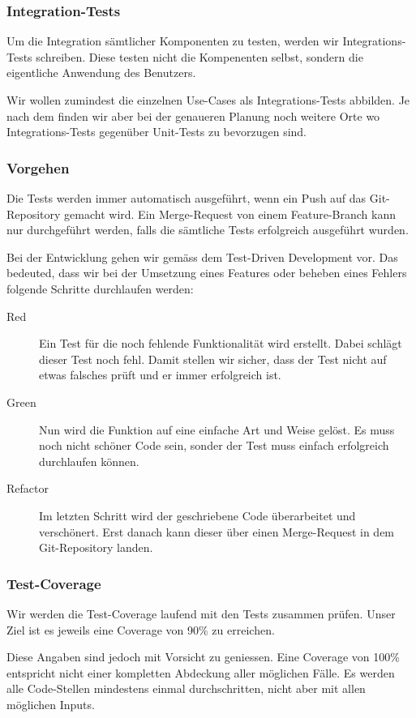 \documentclass[a4paper]{article}
\begin{document}
\subsubsection{Integration-Tests}

Um die Integration sämtlicher Komponenten zu testen, werden wir Integrations-Tests schreiben.
Diese testen nicht die Kompenenten selbst, sondern die eigentliche Anwendung des Benutzers.

Wir wollen zumindest die einzelnen Use-Cases als Integrations-Tests abbilden.
Je nach dem finden wir aber bei der genaueren Planung noch weitere Orte wo Integrations-Tests gegenüber Unit-Tests zu bevorzugen sind.

\subsubsection{Vorgehen}

Die Tests werden immer automatisch ausgeführt, wenn ein Push auf das Git-Repository gemacht wird.
Ein Merge-Request von einem Feature-Branch kann nur durchgeführt werden, falls die sämtliche Tests erfolgreich ausgeführt wurden.

Bei der Entwicklung gehen wir gemäss dem Test-Driven Development vor.
Das bedeuted, dass wir bei der Umsetzung eines Features oder beheben eines Fehlers folgende Schritte durchlaufen werden:

\begin{description}
  \item[Red]
    Ein Test für die noch fehlende Funktionalität wird erstellt.
    Dabei schlägt dieser Test noch fehl.
    Damit stellen wir sicher, dass der Test nicht auf etwas falsches prüft und er immer erfolgreich ist.
  \item[Green]
    Nun wird die Funktion auf eine einfache Art und Weise gelöst.
    Es muss noch nicht schöner Code sein, sonder der Test muss einfach erfolgreich durchlaufen können.
  \item[Refactor]
    Im letzten Schritt wird der geschriebene Code überarbeitet und verschönert.
    Erst danach kann dieser über einen Merge-Request in dem Git-Repository landen.
\end{description}

\subsubsection{Test-Coverage}

Wir werden die Test-Coverage laufend mit den Tests zusammen prüfen.
Unser Ziel ist es jeweils eine Coverage von 90\% zu erreichen.

Diese Angaben sind jedoch mit Vorsicht zu geniessen.
Eine Coverage von 100\% entspricht nicht einer kompletten Abdeckung aller möglichen Fälle.
Es werden alle Code-Stellen mindestens einmal durchschritten, nicht aber mit allen möglichen Inputs.
\end{document}
